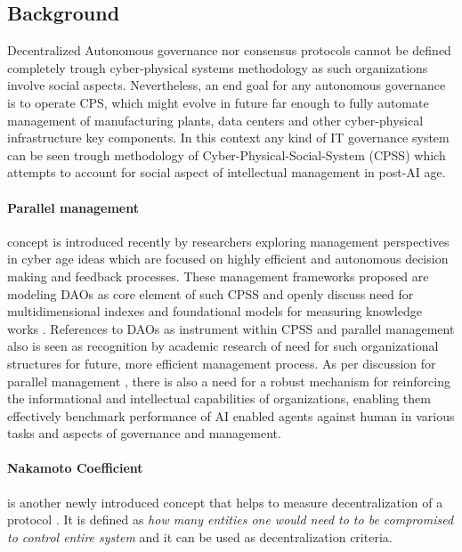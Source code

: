\documentclass{article}
\begin{document}
\begin{CJK}{UTF8}{gbsn}
\begin{multicols}{2}
        \section{Background}
        Decentralized Autonomous governance nor consensus protocols cannot be defined completely trough cyber-physical systems \cite{Lee2008} methodology as such organizations involve social aspects. Nevertheless, an end goal for any autonomous governance is to operate CPS, which might evolve in future far enough to fully automate management of manufacturing plants, data centers and other cyber-physical infrastructure key components. In this context any kind of IT governance system can be seen trough methodology of Cyber-Physical-Social-System (CPSS) \cite{Fei2016} which attempts to account for social aspect of intellectual management in post-AI age.

        \paragraph{Parallel management} concept is introduced recently by researchers exploring management perspectives in cyber age \cite{Wang2022} ideas which are focused on highly efficient and autonomous decision making and feedback processes. These management frameworks proposed are modeling DAOs as core element of such CPSS and openly discuss need for multidimensional indexes and foundational models for measuring knowledge works \cite{Juanjuan2023}. References to DAOs as instrument within CPSS and parallel management also is seen as recognition by academic research of need for such organizational structures for future, more efficient management process. As per discussion for parallel management \cite{Wang2022}, there is also a need for a robust mechanism for reinforcing the informational and intellectual capabilities of organizations, enabling them effectively benchmark performance of AI enabled agents against human in various tasks and aspects of governance and management.

        \paragraph{Nakamoto Coefficient} is another newly introduced concept that helps to measure decentralization of a protocol \cite{Balaji2017}. It is defined as \textit{how many entities one would need to to be compromised to control entire system} and it can be used as decentralization criteria.


\end{multicols}
\end{CJK}
\end{document}
